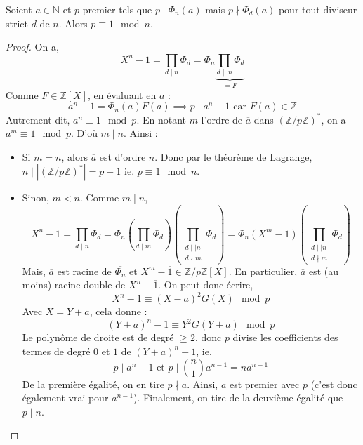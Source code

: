 






  \begin{lemma}
    \label{theoreme-de-dirichlet-faible-1}
    Soient $a \in \mathbb{N}$ et $p$ premier tels que $p \mid \Phi_n(a)$ mais $p \nmid \Phi_d(a)$ pour tout diviseur strict $d$ de $n$. Alors $p \equiv 1 \mod n$.
  \end{lemma}

  \begin{proof}
    On a,
    \[ X^n - 1 = \prod_{d \mid n} \Phi_d = \Phi_n \underbrace{\prod_{d \mid \mid n} \Phi_d}_{= F} \]
    Comme $F \in \mathbb{Z}[X]$, en évaluant en $a$ :
    \[ a^n - 1 = \Phi_n(a) F(a) \implies p \mid a^n - 1 \text{ car } F(a) \in \mathbb{Z} \]
    Autrement dit, $a^n \equiv 1 \mod p$. En notant $m$ l'ordre de $\overline{a}$ dans $(\mathbb{Z}/p\mathbb{Z})^*$, on a $a^m \equiv 1 \mod p$. D'où $m \mid n$. Ainsi :
    \begin{itemize}
      \item Si $m = n$, alors $\overline{a}$ est d'ordre $n$. Donc par le théorème de Lagrange, $n \mid |(\mathbb{Z}/p\mathbb{Z})^*| = p-1$ ie. $p \equiv 1 \mod n$.
      \item Sinon, $m < n$. Comme $m \mid n$,
      \[ X^n-1 = \prod_{d \mid n} \Phi_d = \Phi_n \left ( \prod_{d \mid m} \Phi_d \right ) \left ( \prod_{\substack{d \mid \mid n \\ d \nmid m}} \Phi_d \right ) = \Phi_n (X^m - 1) \left ( \prod_{\substack{d \mid \mid n \\ d \nmid m}} \Phi_d \right ) \]
      Mais, $\overline{a}$ est racine de $\overline{\Phi_n}$ et $X^m - \overline{1} \in \mathbb{Z}/p\mathbb{Z}[X]$. En particulier, $\overline{a}$ est (au moins) racine double de $X^n - \overline{1}$. On peut donc écrire,
      \[ X^n - 1 \equiv (X-a)^2 G(X) \mod p \]
      Avec $X = Y+a$, cela donne :
      \[ (Y+a)^n - 1 \equiv Y^2 G(Y+a) \mod p \]
      Le polynôme de droite est de degré $\geq 2$, donc $p$ divise les coefficients des termes de degré $0$ et $1$ de $(Y+a)^n-1$, ie.
      \[ p \mid a^n - 1 \text{ et } p \mid \binom{n}{1} a^{n-1} = n a^{n-1} \]
      De la première égalité, on en tire $p \nmid a$. Ainsi, $a$ est premier avec $p$ (c'est donc également vrai pour $a^{n-1}$). Finalement, on tire de la deuxième égalité que $p \mid n$.
    \end{itemize}
  \end{proof}


